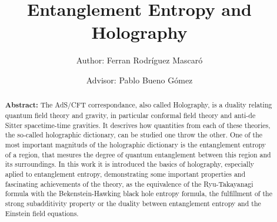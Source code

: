 \documentclass[twocolumn]{revtex4}
\begin{document}
\pagestyle{fancy}


\title{Entanglement Entropy and Holography}
\author{Author: Ferran Rodríguez Mascaró}
\author{Advisor: Pablo Bueno Gómez}


\begin{abstract}
    {\bf Abstract:} The AdS/CFT correspondance, also called Holography, is a duality relating quantum field theory and gravity, in particular conformal field theory and anti-de Sitter spacetime-time gravities. It descrives how quantities from each of these theories, the so-called holographic dictionary, can be studied one throw the other. One of the most important magnituds of the holographic dictionary is the entanglement entropy of a region, that mesures the degree of quantum entanglement between this region and its surroundings. In this work it is introduced the basics of holography, especially aplied to entanglement entropy, demonstrating some important properties and fascinating achievements of the theory, as the equivalence of the Ryu-Takayanagi formula with the Bekenstein-Hawking black hole entropy formula, the fulfillment of the strong subadditivity property or the duality between entanglement entropy and the Einstein field equations.
\end{abstract}


\maketitle




\end{document}
